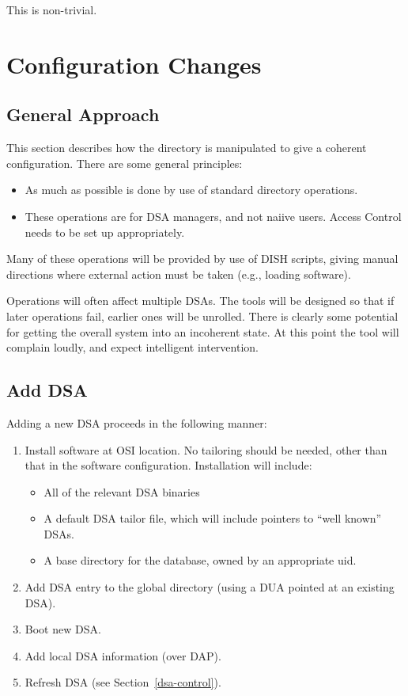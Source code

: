 This is non-trivial.


\section {Configuration Changes}

\subsection {General Approach}

This section describes how the directory is manipulated to give a coherent
configuration.   There are some general principles:

\begin {itemize}
\item  As much as possible is done by use of standard directory operations.
\item These operations are for DSA managers, and not naiive users.  Access
Control needs to be set up appropriately.
\end {itemize}

Many of these operations will be provided by use of DISH scripts, giving
manual directions where external action must be taken (e.g., loading
software).   

Operations will often affect multiple DSAs.  The tools will be designed so
that if later operations fail, earlier ones will be unrolled.  There is
clearly some potential for getting the overall system into an incoherent
state.  At this point the tool will complain loudly, and expect intelligent
intervention.   

\subsection {Add DSA}
\label {add-dsa}

Adding a new DSA proceeds in the following manner:

\begin {enumerate}
\item Install software at OSI location.  No tailoring should be needed,
other than that in the software configuration.
Installation will include:
\begin {itemize}
\item All of the relevant DSA binaries 
\item A default DSA tailor file, which will include pointers to ``well
known'' DSAs.
\item A base directory for the database, owned by an appropriate uid.
\end {itemize}

\item Add DSA entry to the global directory (using a DUA pointed at an
existing DSA).
\label{global-step}

\item Boot new DSA.
\item Add local DSA information (over DAP).
\item Refresh DSA (see Section~\ref{dsa-control}).
\end {enumerate}

